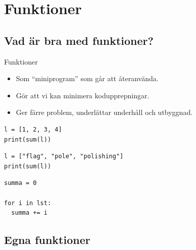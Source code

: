 \mode*

\section{Funktioner}

\subsection{Vad är bra med funktioner?}

\begin{frame}[fragile]
  \begin{block}{Funktioner}
    \begin{itemize}
      \item Som \enquote{miniprogram} som går att återanvända.
      \item Gör att vi kan minimera kodupprepningar.
      \item Ger färre problem, underlättar underhåll och utbyggnad.
    \end{itemize}
  \end{block}
\end{frame}

\begin{frame}[fragile]
  \begin{example}[Summera]
    \begin{lstlisting}
l = [1, 2, 3, 4]
print(sum(l))
    \end{lstlisting}
  \end{example}

  \begin{example}[Konkatenera]
    \begin{lstlisting}
l = ["flag", "pole", "polishing"]
print(sum(l))
    \end{lstlisting}
  \end{example}
\end{frame}

\begin{frame}[fragile]
  \begin{example}
    \begin{lstlisting}
summa = 0

for i in lst:
  summa += i
    \end{lstlisting}
  \end{example}
\end{frame}


\subsection{Egna funktioner}

